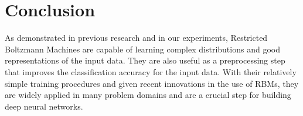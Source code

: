 \documentclass[journal]{IEEEtran}
\begin{document}
\section{Conclusion}

As demonstrated in previous research and in our experiments, Restricted Boltzmann Machines are capable of learning complex distributions and good representations of the input data. They are also useful as a preprocessing step that improves the classification accuracy for the input data. With their relatively simple training procedures and given recent innovations in the use of RBMs, they are widely applied in many problem domains and are a crucial step for building deep neural networks.






%
%
%



\end{document}
